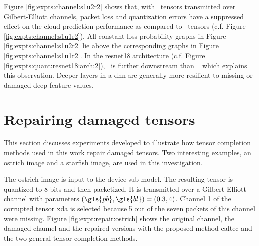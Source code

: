 Figure \ref{fig:expts:channel:s1u2r2}  shows that, with \soneunittworelutwo~tensors transmitted over Gilbert-Elliott channels, packet loss and quantization errors have a suppressed effect on the cloud prediction performance as compared to \soneunitonerelutwo~tensors (c.f. Figure \ref{fig:expts:channel:s1u1r2}). All constant loss probability graphs in Figure \ref{fig:expts:channel:s1u2r2} lie above the corresponding graphs in Figure \ref{fig:expts:channel:s1u1r2}. In the \gls{resnet18} architecture (c.f. Figure \ref{fig:expts:quant:resnet18:arch:2}), \soneunittworelutwo~is further downstream than \soneunitonerelutwo~ which explains this observation. Deeper layers in a \gls{dnn} are generally more resilient to missing or damaged deep feature values.

\section{Repairing damaged tensors} \label{sec:expts:repair}
This section discusses experiments developed to illustrate how tensor completion methods used in this work repair damaged tensors. Two interesting examples, an ostrich image and a starfish image, are used in this investigation.

The ostrich image is input to the device sub-model. The resulting tensor is quantized to 8-bits and then packetized. It is transmitted over a Gilbert-Elliott channel with parameters $(\gls{pb},\gls{bl}) = (0.3,4)$. Channel 1 of the corrupted tensor \gls{xda} is selected because 5 out of the seven packets of this channel were missing. Figure \ref{fig:expt:repair:ostrich} shows the original channel, the damaged channel and the repaired versions with the proposed method \gls{caltec} and the two general tensor completion methods.


